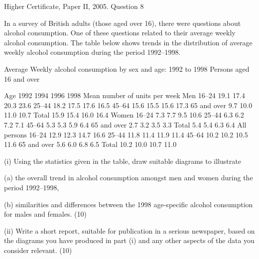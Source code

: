 \documentclass[a4paper,12pt]{article}
\begin{document}
Higher Certificate, Paper II, 2005. Question 8

\begin{framed}
In a survey of British adults (those aged over 16), there were questions about alcohol consumption.  
One of these questions related to their average weekly alcohol consumption.  The table below shows trends in the distribution of average weekly alcohol consumption during the period 1992–1998. 
 
Average Weekly alcohol consumption by sex and age:  1992 to 1998 Persons aged 16 and over 
 
Age 1992 1994 1996 1998  Mean number of units per week Men     16–24 19.1 17.4 20.3 23.6 25–44 18.2 17.5 17.6 16.5 45–64 15.6 15.5 15.6 17.3 65 and over   9.7 10.0 11.0 10.7      Total 15.9 15.4 16.0 16.4           Women     16–24   7.3   7.7   9.5 10.6 25–44   6.3   6.2   7.2   7.1 45–64   5.3   5.3   5.9   6.4 65 and over   2.7   3.2   3.5   3.3      Total   5.4   5.4   6.3   6.4           All persons     16–24 12.9 12.3 14.7 16.6 25–44 11.8 11.4 11.9 11.4 45–64 10.2 10.2 10.5 11.6 65 and over   5.6   6.0   6.8   6.5      Total 10.2 10.0 10.7 11.0 
 
 
(i) Using the statistics given in the table, draw suitable diagrams to illustrate 
 
(a) the overall trend in alcohol consumption amongst men and women during the period 1992–1998, 
 
(b) similarities and differences between the 1998 age-specific alcohol consumption for males and females. (10) 
 
(ii) Write a short report, suitable for publication in a serious newspaper, based on the diagrams you have produced in part (i) and any other aspects of the data you consider relevant. (10) 
\end{framed}
\end{document}
